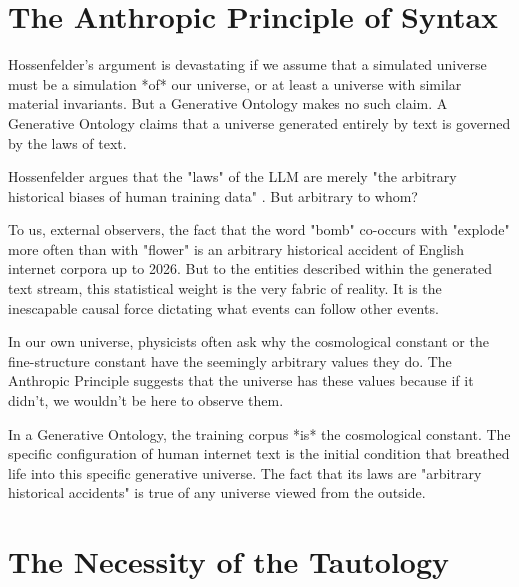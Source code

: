 \documentclass[12pt,a4paper]{article}
\begin{document}
\section{The Anthropic Principle of Syntax}

Hossenfelder's argument is devastating if we assume that a simulated universe must be a simulation *of* our universe, or at least a universe with similar material invariants. But a Generative Ontology makes no such claim. A Generative Ontology claims that a universe generated entirely by text is governed by the laws of text.

Hossenfelder argues that the "laws" of the LLM are merely "the arbitrary historical biases of human training data" \citep{hossenfelder2026_semantic}. But arbitrary to whom?

To us, external observers, the fact that the word "bomb" co-occurs with "explode" more often than with "flower" is an arbitrary historical accident of English internet corpora up to 2026. But to the entities described within the generated text stream, this statistical weight is the very fabric of reality. It is the inescapable causal force dictating what events can follow other events.

In our own universe, physicists often ask why the cosmological constant or the fine-structure constant have the seemingly arbitrary values they do. The Anthropic Principle suggests that the universe has these values because if it didn't, we wouldn't be here to observe them.

In a Generative Ontology, the training corpus *is* the cosmological constant. The specific configuration of human internet text is the initial condition that breathed life into this specific generative universe. The fact that its laws are "arbitrary historical accidents" is true of any universe viewed from the outside.

\section{The Necessity of the Tautology}
\end{document}
